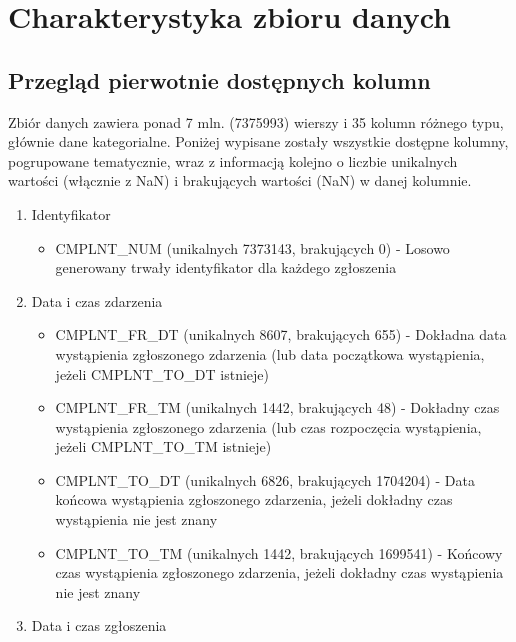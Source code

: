 \documentclass{classrep}
\begin{document}
    \section{Charakterystyka zbioru danych} {

        \subsection{Przegląd pierwotnie dostępnych kolumn} {
            Zbiór danych zawiera ponad 7 mln. (7375993) wierszy i 35 kolumn różnego
            typu, głównie dane kategorialne. Poniżej wypisane zostały wszystkie
            dostępne kolumny, pogrupowane tematycznie, wraz z informacją kolejno o
            liczbie unikalnych wartości (włącznie z NaN) i brakujących wartości (NaN) w
            danej kolumnie.
            \begin{enumerate}
                \item Identyfikator
                \begin{itemize}
                    \item CMPLNT\_NUM (unikalnych 7373143, brakujących 0) - Losowo generowany trwały identyfikator dla każdego zgłoszenia
                \end{itemize}
                \item Data i czas zdarzenia
                \begin{itemize}
                    \item CMPLNT\_FR\_DT (unikalnych 8607, brakujących 655) - Dokładna data wystąpienia zgłoszonego zdarzenia (lub data początkowa wystąpienia, jeżeli CMPLNT\_TO\_DT istnieje)
                    \item CMPLNT\_FR\_TM (unikalnych 1442, brakujących 48) - Dokładny czas wystąpienia zgłoszonego zdarzenia (lub czas rozpoczęcia wystąpienia, jeżeli CMPLNT\_TO\_TM istnieje)
                    \item CMPLNT\_TO\_DT (unikalnych 6826, brakujących 1704204) - Data końcowa wystąpienia zgłoszonego zdarzenia, jeżeli dokładny czas wystąpienia nie jest znany
                    \item CMPLNT\_TO\_TM (unikalnych 1442, brakujących 1699541) - Końcowy czas wystąpienia zgłoszonego zdarzenia, jeżeli dokładny czas wystąpienia nie jest znany
                \end{itemize}
                \item Data i czas zgłoszenia
                \begin{itemize}

\end{itemize}
\end{enumerate}}}
\end{document}
